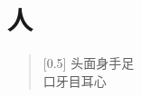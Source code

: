 \documentclass[12pt,UTF-8,openany]{ctexbook}
\begin{document}
\hanzibox{}\hanzibox{}\hanzibox{}\hanzibox{}\hspace{1em}\hanzibox{}\hanzibox{}\hanzibox{}\hanzibox{}

\hanzibox{}\hanzibox{}\hanzibox{}\hanzibox{}\hspace{1em}\hanzibox{}\hanzibox{}\hanzibox{}\hanzibox{}

\hanzibox{}\hanzibox{}\hanzibox{}\hanzibox{}\hspace{1em}\hanzibox{}\hanzibox{}\hanzibox{}\hanzibox{}

\hanzibox{}\hanzibox{}\hanzibox{}\hanzibox{}\hspace{1em}\hanzibox{}\hanzibox{}\hanzibox{}\hanzibox{}

\hanzibox{}\hanzibox{}\hanzibox{}\hanzibox{}\hspace{1em}\hanzibox{}\hanzibox{}\hanzibox{}\hanzibox{}

\hanzibox{}\hanzibox{}\hanzibox{}\hanzibox{}\hspace{1em}\hanzibox{}\hanzibox{}\hanzibox{}\hanzibox{}

\hanzibox{}\hanzibox{}\hanzibox{}\hanzibox{}\hspace{1em}




\chapter{人}

\begin{large}
    
    \begin{verse}[0.5\linewidth]
        头面身手足 \\
        口牙目耳心
    \end{verse}
    
\end{large}


\clearpage

\begin{center}
    
    
    
\end{center}


\hanzibox{}\hanzibox{}\hanzibox{}\hanzibox{}\hspace{1em}\hanzibox{}\hanzibox{}\hanzibox{}\hanzibox{}
\end{document}
